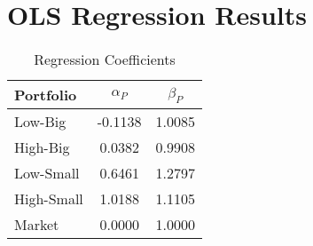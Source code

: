 \documentclass{article}
\begin{document}
\section*{OLS Regression Results}
\begin{table}[h]
\centering
\begin{tabular}{lcc}
\toprule
Portfolio & $\alpha_P$ & $\beta_P$ \\
\midrule
Low-Big & -0.1138 & 1.0085 \\
High-Big & 0.0382 & 0.9908 \\
Low-Small & 0.6461 & 1.2797 \\
High-Small & 1.0188 & 1.1105 \\
Market & 0.0000 & 1.0000 \\
\bottomrule
\end{tabular}
\caption{Regression Coefficients}
\end{table}
\newpage
\end{document}
